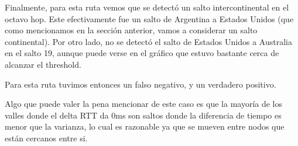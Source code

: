 Finalmente, para esta ruta vemos que se detectó un salto intercontinental en el octavo hop. Este efectivamente fue un salto de Argentina a Estados Unidos (que como mencionamos en la sección anterior, vamos a considerar un salto continental). Por otro lado, no se detectó el salto de Estados Unidos a Australia en el salto 19, aunque puede verse en el gráfico que estuvo bastante cerca de alcanzar el threshold.

Para esta ruta tuvimos entonces un falso negativo, y un verdadero positivo.

Algo que puede valer la pena mencionar de este caso es que la mayoría de los valles donde el delta RTT da 0ms son saltos donde la diferencia de tiempo es menor que la varianza, lo cual es razonable ya que se mueven entre nodos que están cercanos entre si.
